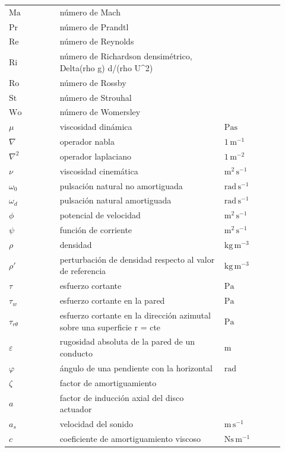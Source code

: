 \documentclass[10pt,openany]{book}
\begin{document}
\begin{longtable}{@{}>{\centering\arraybackslash}p{0.17\linewidth}>{\raggedright\arraybackslash}p{0.55\linewidth}>{\raggedright\arraybackslash}p{0.2\linewidth}@{}}
$\mathrm{Ma}$ & número de Mach &  \\
$\mathrm{Pr}$ & número de Prandtl &  \\
$\mathrm{Re}$ & número de Reynolds &  \\
$\mathrm{Ri}$ & número de Richardson densimétrico, Delta(rho g) d/(rho U\textasciicircum{}2) &  \\
$\mathrm{Ro}$ & número de Rossby &  \\
$\mathrm{St}$ & número de Strouhal &  \\
$\mathrm{Wo}$ & número de Womersley &  \\
$\mu$ & viscosidad dinámica & $\mathrm{Pa s}$ \\
$\nabla$ & operador nabla & $\mathrm{1\,m^{-1}}$ \\
$\nabla^{2}$ & operador laplaciano & $\mathrm{1\,m^{-2}}$ \\
$\nu$ & viscosidad cinemática & $\mathrm{m^{2}\,s^{-1}}$ \\
$\omega_0$ & pulsación natural no amortiguada & $\mathrm{rad\,s^{-1}}$ \\
$\omega_d$ & pulsación natural amortiguada & $\mathrm{rad\,s^{-1}}$ \\
$\phi$ & potencial de velocidad & $\mathrm{m^{2}\,s^{-1}}$ \\
$\psi$ & función de corriente & $\mathrm{m^{2}\,s^{-1}}$ \\
$\rho$ & densidad & $\mathrm{kg\,m^{-3}}$ \\
$\rho'$ & perturbación de densidad respecto al valor de referencia & $\mathrm{kg\,m^{-3}}$ \\
$\tau$ & esfuerzo cortante & $\mathrm{Pa}$ \\
$\tau_w$ & esfuerzo cortante en la pared & $\mathrm{Pa}$ \\
$\tau_{r\theta}$ & esfuerzo cortante en la dirección azimutal sobre una superficie r = cte & $\mathrm{Pa}$ \\
$\varepsilon$ & rugosidad absoluta de la pared de un conducto & $\mathrm{m}$ \\
$\varphi$ & ángulo de una pendiente con la horizontal & $\mathrm{rad}$ \\
$\zeta$ & factor de amortiguamiento &  \\
$a$ & factor de inducción axial del disco actuador &  \\
$a_{s}$ & velocidad del sonido & $\mathrm{m\,s^{-1}}$ \\
$c$ & coeficiente de amortiguamiento viscoso & $\mathrm{N s\,m^{-1}}$ \\

\end{longtable}
\end{document}
